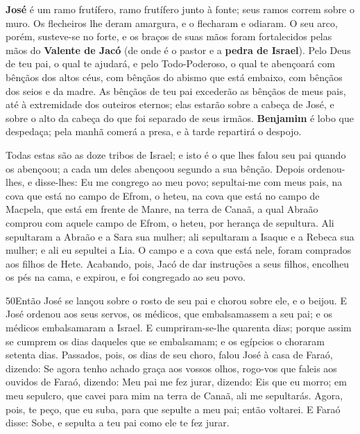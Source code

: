 \textbf{José} é um ramo frutífero, ramo frutífero junto à fonte;
seus ramos correm sobre o muro. Os flecheiros lhe deram
amargura, e o flecharam e odiaram. O seu arco, porém,
susteve-se no forte, e os braços de suas mãos foram fortalecidos
pelas mãos do \textbf{Valente de Jacó} (de onde é o pastor e a
\textbf{pedra de Israel}). Pelo Deus de teu pai, o qual te
ajudará, e pelo Todo-Poderoso, o qual te abençoará com bênçãos dos
altos céus, com bênçãos do abismo que está embaixo, com bênçãos dos
seios e da madre. As bênçãos de teu pai excederão as bênçãos
de meus pais, até à extremidade dos outeiros eternos; elas estarão
sobre a cabeça de José, e sobre o alto da cabeça do que foi separado
de seus irmãos. \textbf{Benjamim} é lobo que despedaça; pela
manhã comerá a presa, e à tarde repartirá o despojo.

Todas estas são as doze tribos de Israel; e isto é o que lhes
falou seu pai quando os abençoou; a cada um deles abençoou segundo a
sua bênção. Depois ordenou-lhes, e disse-lhes: Eu me congrego
ao meu povo; sepultai-me com meus pais, na cova que está no campo de
Efrom, o heteu, na cova que está no campo de Macpela, que
está em frente de Manre, na terra de Canaã, a qual Abraão comprou
com aquele campo de Efrom, o heteu, por herança de sepultura.
Ali sepultaram a Abraão e a Sara sua mulher; ali sepultaram a
Isaque e a Rebeca sua mulher; e ali eu sepultei a Lia. O
campo e a cova que está nele, foram comprados aos filhos de Hete.
Acabando, pois, Jacó de dar instruções a seus filhos,
encolheu os pés na cama, e expirou, e foi congregado ao seu povo.

\smallskip

\lettrine{50} Então José se lançou sobre o rosto de seu pai e
chorou sobre ele, e o beijou. E José ordenou aos seus servos, os
médicos, que embalsamassem a seu pai; e os médicos embalsamaram a
Israel. E cumpriram-se-lhe quarenta dias; porque assim se
cumprem os dias daqueles que se embalsamam; e os egípcios o choraram
setenta dias. Passados, pois, os dias de seu choro, falou José à
casa de Faraó, dizendo: Se agora tenho achado graça aos vossos
olhos, rogo-vos que faleis aos ouvidos de Faraó, dizendo: Meu
pai me fez jurar, dizendo: Eis que eu morro; em meu sepulcro, que
cavei para mim na terra de Canaã, ali me sepultarás. Agora, pois, te
peço, que eu suba, para que sepulte a meu pai; então voltarei. E
Faraó disse: Sobe, e sepulta a teu pai como ele te fez jurar.

